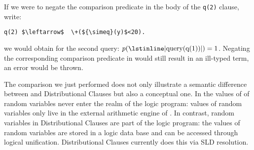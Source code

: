 If we were to negate the comparison predicate in the body of the \lstinline|q(2)| clause, \ie write:
\begin{adjustwidth}{1em}{0em}
	{
		\normalfont
		\begin{lstlisting}[breaklines,mathescape]
q(2) $\leftarrow$  \+(${\simeq}(y)$<20).
		\end{lstlisting}
	}
\end{adjustwidth}
we would obtain for the second query: $ p(\text{\lstinline|query(q(1))|}) =1$. Negating the corresponding comparison predicate in \dcproblogsty would still result in an ill-typed term, \ie an error would be thrown.

The comparison we just performed does not only illustrate a semantic difference between \dcproblogsty and Distributional Clauses but also a conceptual one. In \dcproblogsty the values of of random variables never enter the realm of the logic program: values of random variables only live in the external arithmetic engine of \dcproblogsty. In contrast,  random variables in Distributional Clauses are part of the logic program: the values of random variables are stored in a logic data base and can be accessed through logical unification. Distributional Clauses currently does this via SLD resolution.
